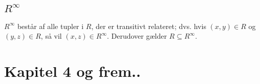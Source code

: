 \documentclass[a4paper]{article}
\begin{document}
\subsection{$R^\infty$}

$R^\infty$ består af alle tupler i $R$, der er transitivt relateret; dvs. hvis $(x, y) \in R$
og $(y, z) \in R$, så vil $(x, z) \in R^\infty$. Derudover gælder $R \subseteq R^\infty$.

\section{Kapitel 4 og frem..}
\end{document}

